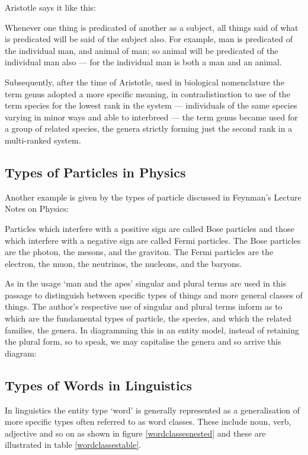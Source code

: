 Aristotle says it like this:
\begin{erquote}
Whenever one thing is predicated of another as a subject, all things said of what is predicated will be said of the subject also. For example, man is predicated of the individual man, and animal of man; so animal will be predicated of the individual man also — for the individual man is both a man and an animal.
\end{erquote}
Subsequently, after the time of Aristotle, used in biological nomenclature the term genus adopted a more specific meaning, in contradistinction to use of the term species for the lowest rank in the system — individuals of the same species varying in minor ways and able to interbreed — the term genus became used for a group of related species, the genera strictly forming just the second rank in a multi-ranked system.

\subsection*{Types of Particles in Physics}
Another example is given by the types of particle discussed in Feynman's Lecture Notes on Physics:
\begin{erquote}
Particles which interfere with a positive sign are called Bose particles and those which interfere with a negative sign are called Fermi particles. The Bose particles are the photon, the mesons, and the graviton. The Fermi particles are the electron, the muon, the neutrinos, the nucleons, and the baryons.
\end{erquote}
As in the usage ‘man and the apes’ singular and plural terms are used in this passage to distinguish between specific types of things and more general classes of things. The author's respective use of singular and plural terms inform as to which are the fundamental types of particle, the species, and which the related families, the genera. In diagramming this in an entity model, instead of retaining the plural form, so to speak, we may capitalise the genera and so arrive this diagram:
\begin{center}

\end{center}

\subsection*{Types of Words in Linguistics}
In linguistics the entity type ‘word’ is generally represented as a generalisation of more specific types often referred to as word classes. These include noun, verb, adjective and so on as shown in figure \ref{wordclassesnested} and these are illustrated in table \ref{wordclassestable}.

